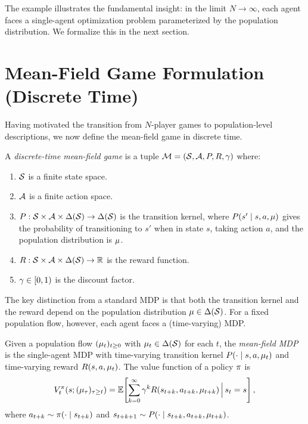 \documentclass[11pt,a4paper]{article}
\begin{document}
The example illustrates the fundamental insight: in the limit
$N \to \infty$, each agent faces a single-agent optimization
problem parameterized by the population distribution.  We
formalize this in the next section.


\section{Mean-Field Game Formulation (Discrete Time)}
\label{sec:mfg-formulation}

Having motivated the transition from $N$-player games to
population-level descriptions, we now define the mean-field game
in discrete time.

\begin{definition}
\label{def:mfg}
A \emph{discrete-time mean-field game} is a tuple
$\mathcal{M} = (\mathcal{S}, \mathcal{A}, P, R, \gamma)$ where:
\begin{enumerate}[nosep]
  \item $\mathcal{S}$ is a finite state space.
  \item $\mathcal{A}$ is a finite action space.
  \item $P: \mathcal{S} \times \mathcal{A} \times \Delta(\mathcal{S})
    \to \Delta(\mathcal{S})$ is the transition kernel, where
    $P(s' \mid s, a, \mu)$ gives the probability of
    transitioning to $s'$ when in state $s$, taking action $a$,
    and the population distribution is $\mu$.
  \item $R: \mathcal{S} \times \mathcal{A} \times \Delta(\mathcal{S})
    \to \mathbb{R}$ is the reward function.
  \item $\gamma \in [0,1)$ is the discount factor.
\end{enumerate}
\end{definition}

The key distinction from a standard MDP is that both the transition
kernel and the reward depend on the population distribution
$\mu \in \Delta(\mathcal{S})$.  For a fixed population flow,
however, each agent faces a (time-varying) MDP.

\begin{definition}
\label{def:mf-mdp}
Given a population flow $(\mu_t)_{t \geq 0}$ with
$\mu_t \in \Delta(\mathcal{S})$ for each $t$, the
\emph{mean-field MDP} is the single-agent MDP with time-varying
transition kernel $P(\cdot \mid s, a, \mu_t)$ and
time-varying reward $R(s, a, \mu_t)$.  The value function
of a policy $\pi$ is
\[
  V_t^{\pi}(s; (\mu_\tau)_{\tau \geq t})
  = \mathbb{E}\!\left[\sum_{k=0}^{\infty} \gamma^k
    R(s_{t+k}, a_{t+k}, \mu_{t+k})
    \,\Big|\, s_t = s\right],
\]
where $a_{t+k} \sim \pi(\cdot \mid s_{t+k})$ and
$s_{t+k+1} \sim P(\cdot \mid s_{t+k}, a_{t+k}, \mu_{t+k})$.
\end{definition}
\end{document}
